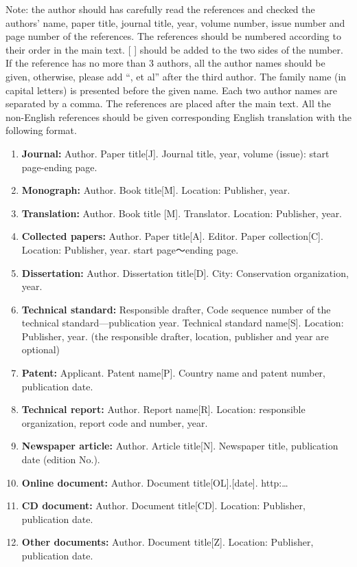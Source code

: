 ﻿\documentclass[UTF8]{csoarticle}
\begin{document}
Note: the author should has carefully read the references and checked the authors’ name, paper title, journal title, year, volume number, issue number and page number of the references. The references should be numbered according to their order in the main text. [ ] should be added to the two sides of the number. If the reference has no more than 3 authors, all the author names should be given, otherwise, please add “, et al” after the third author. The family name (in capital letters) is presented before the given name. Each two author names are separated by a comma. The references are placed after the main text. All the non-English references should be given corresponding English translation with the following format.
\begin{enumerate}
\item\textbf{Journal:}     Author. Paper title[J]. Journal title, year, volume (issue): start page-ending page.
\item\textbf{Monograph:}      Author. Book title[M]. Location: Publisher, year.
\item\textbf{Translation:}     Author. Book title [M]. Translator. Location: Publisher, year.
\item\textbf{Collected papers:}   Author. Paper title[A]. Editor. Paper collection[C]. Location: Publisher, year. start page～ending page.
\item\textbf{Dissertation:}  Author. Dissertation title[D]. City: Conservation organization, year.
\item\textbf{Technical standard:} Responsible drafter, Code sequence number of the technical standard—publication year. Technical standard name[S]. Location: Publisher, year. (the responsible drafter, location, publisher and year are optional)
\item\textbf{Patent:}     Applicant. Patent name[P]. Country name and patent number, publication date.
\item\textbf{Technical report:} Author. Report name[R]. Location: responsible organization, report code and number, year.
\item\textbf{Newspaper article:} Author. Article title[N]. Newspaper title, publication date (edition No.).
\item\textbf{Online document:} Author. Document title[OL].[date]. http:…
\item\textbf{CD document:} Author. Document title[CD]. Location: Publisher, publication date.
\item\textbf{Other documents:} Author. Document title[Z]. Location: Publisher, publication date.
\end{enumerate}
\end{document}
